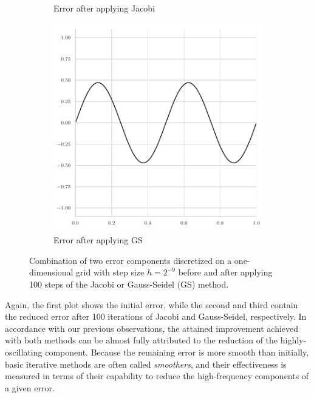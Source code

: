 \begin{figure}
\begin{subfigure}[t]{0.32\textwidth}
		\caption{Error after applying Jacobi}
\end{subfigure}
\begin{subfigure}[t]{0.32\textwidth}
	\centering
	\includegraphics[width=\textwidth]{figures/error_plots//final_error_gauss_seidel_combined.pdf}
	\caption{Error after applying GS}
\end{subfigure}
	\caption{Combination of two error components discretized on a one-dimensional grid with step size $h = 2^{-9}$ before and after applying 100 steps of the Jacobi or Gauss-Seidel (GS) method.}
\label{fig:combined-error}
\end{figure}
Again, the first plot shows the initial error, while the second and third contain the reduced error after 100 iterations of Jacobi and Gauss-Seidel, respectively.
In accordance with our previous observations, the attained improvement achieved with both methods can be almost fully attributed to the reduction of the highly-oscillating component.
Because the remaining error is more smooth than initially, basic iterative methods are often called \emph{smoothers}, and their effectiveness is measured in terms of their capability to reduce the high-frequency components of a given error. 

